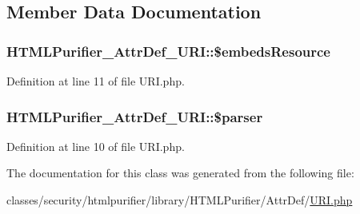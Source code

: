 \subsection{Member Data Documentation}
\hypertarget{classHTMLPurifier__AttrDef__URI_ac159995ddeb224f67ab5b87e523505e1}{
\subsubsection[{\$embeds\+Resource}]{\setlength{\rightskip}{0pt plus 5cm}H\+T\+M\+L\+Purifier\+\_\+\+Attr\+Def\+\_\+\+U\+R\+I\+::\$embeds\+Resource\hspace{0.3cm}{\ttfamily [protected]}}}\label{classHTMLPurifier__AttrDef__URI_ac159995ddeb224f67ab5b87e523505e1}


Definition at line 11 of file U\+R\+I.\+php.

\hypertarget{classHTMLPurifier__AttrDef__URI_a52a7426b1f733df5ec6474a5cd157178}{
\subsubsection[{\$parser}]{\setlength{\rightskip}{0pt plus 5cm}H\+T\+M\+L\+Purifier\+\_\+\+Attr\+Def\+\_\+\+U\+R\+I\+::\$parser\hspace{0.3cm}{\ttfamily [protected]}}}\label{classHTMLPurifier__AttrDef__URI_a52a7426b1f733df5ec6474a5cd157178}


Definition at line 10 of file U\+R\+I.\+php.



The documentation for this class was generated from the following file\+:\begin{DoxyCompactItemize}
\item 
classes/security/htmlpurifier/library/\+H\+T\+M\+L\+Purifier/\+Attr\+Def/\hyperlink{AttrDef_2URI_8php}{U\+R\+I.\+php}\end{DoxyCompactItemize}
